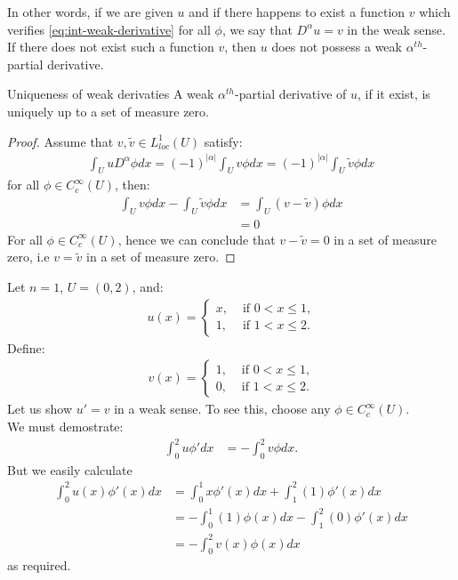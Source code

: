 In other words, if we are given $u$ and if there happens to exist a function $v$ which verifies \ref{eq:int-weak-derivative} for all $\phi$, we say that $D^{\alpha}u=v$ in the weak sense. If there does not exist such a function $v$, then $u$ does not possess a weak $\alpha^{th}$-partial derivative.
\begin{lemma}{Uniqueness of weak derivaties}
  A weak $\alpha^{th}$-partial derivative of $u$, if it exist, is uniquely up to a set of measure zero.
\end{lemma}
\begin{proof} 
  Assume that $v,\tilde{v}\in L^{1}_{loc}(U)$ satisfy:
  \begin{align*}
    \int_{U}uD^{\alpha}\phi dx=(-1)^{|\alpha|}\int_{U}v\phi dx=(-1)^{|\alpha|}\int_{U}\tilde{v}\phi dx
  \end{align*}
  for all $\phi\in C^{\infty}_{c}(U)$, then:
  \begin{align*}
    \int_{U}v\phi dx-\int_{U}\tilde{v}\phi dx&=\int_{U}(v-\tilde{v})\phi dx\\
    &=0
  \end{align*}
  For all $\phi\in C^{\infty}_{c}(U)$, hence we can conclude that $v-\tilde{v}=0$ in a set of measure zero, i.e $v=\tilde{v}$ in a set of measure zero. 
\end{proof}
\begin{example}{}
  Let $n=1$, $U=(0,2)$, and:
  \begin{align*}
    u(x)= 
    \begin{cases}
      x, &\text{ if } 0<x\leq 1 \text{,} \\
      1, &\text{ if } 1<x\leq 2 .
    \end{cases}
  \end{align*}
  Define:
  \begin{align*}
    v(x)= 
    \begin{cases}
      1, &\text{ if } 0<x\leq 1 \text{,} \\
      0, &\text{ if } 1<x\leq 2 .
    \end{cases}
  \end{align*}
  Let us show $u'=v$ in a weak sense. To see this, choose any $\phi\in C^{\infty}_{c}(U)$.\\
  We must demostrate:
  \begin{align*}
    \int_{0}^{2}u\phi' dx&=-\int_{0}^{2}v\phi dx.
  \end{align*}
  But we easily calculate
  \begin{align*}
    \int_{0}^{2}u(x)\phi'(x)dx&=\int_{0}^{1}x\phi'(x)dx+\int_{1}^{2}(1)\phi'(x) dx\\
    &=-\int_{0}^{1}(1)\phi(x)dx - \int_{1}^{2}(0)\phi'(x)dx\\
    &=-\int_{0}^{2}v(x)\phi(x)dx
  \end{align*}
  as required.
\end{example}
